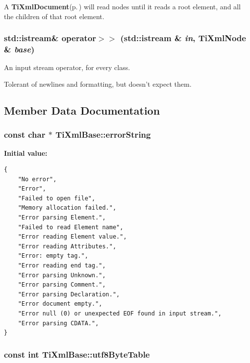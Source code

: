 A {\bf Ti\-Xml\-Document}{\rm (p.\,\pageref{classTiXmlDocument})} will read nodes until it reads a root element, and all the children of that root element.
\subsubsection{\setlength{\rightskip}{0pt plus 5cm}std::istream\& operator$>$$>$ (std::istream \& {\em in}, {\bf Ti\-Xml\-Node} \& {\em base})\hspace{0.3cm}{\tt  [friend, inherited]}}\label{classTiXmlNode_TiXmlUnknownn0}


An input stream operator, for every class. 

Tolerant of newlines and formatting, but doesn't expect them.

\subsection{Member Data Documentation}
\subsubsection{\setlength{\rightskip}{0pt plus 5cm}const char $\ast$ Ti\-Xml\-Base::error\-String\hspace{0.3cm}{\tt  [static, protected, inherited]}}\label{classTiXmlBase_TiXmlUnknownt0}


{\bf Initial value:}

\footnotesize\begin{verbatim}
{
    "No error",
    "Error",
    "Failed to open file",
    "Memory allocation failed.",
    "Error parsing Element.",
    "Failed to read Element name",
    "Error reading Element value.",
    "Error reading Attributes.",
    "Error: empty tag.",
    "Error reading end tag.",
    "Error parsing Unknown.",
    "Error parsing Comment.",
    "Error parsing Declaration.",
    "Error document empty.",
    "Error null (0) or unexpected EOF found in input stream.",
    "Error parsing CDATA.",
}
\end{verbatim}\normalsize 
{}
\subsubsection{\setlength{\rightskip}{0pt plus 5cm}const int Ti\-Xml\-Base::utf8Byte\-Table\hspace{0.3cm}{\tt  [static, inherited]}}\label{classTiXmlBase_TiXmlUnknowns0}


